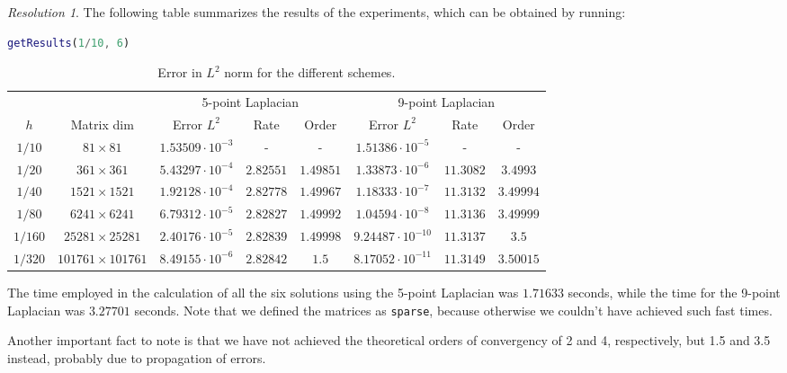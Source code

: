 \documentclass[10pt,a4paper]{article}
\theoremstyle{definition}
\theoremstyle{remark}
\newtheorem*{res}{Resolution}
\begin{document}
\begin{res}
  The following table summarizes the results of the experiments, which can be obtained by running:
  \begin{lstlisting}[language=Matlab]
getResults(1/10, 6)
\end{lstlisting}
  \begin{table}[ht]
    \centering
    \begin{tabular}{|c|c||c|c|c||c|c|c|}
      \hline
              &                       & \multicolumn{3}{c||}{5-point Laplacian} & \multicolumn{3}{c|}{9-point Laplacian}                                                               \\
      \cline{3-8}
      $h$     & Matrix dim            & Error $L^2$                             & Rate                                   & Order     & Error $L^2$             & Rate      & Order     \\
      \hline\hline
      $1/10$  & $81\times 81$         & $1.53509\cdot 10^{-3}$                  & -                                      & -         & $1.51386\cdot 10^{-5}$  & -         & -         \\
      $1/20$  & $361\times 361$       & $5.43297\cdot 10^{-4}$                  & $2.82551$                              & $1.49851$ & $1.33873\cdot 10^{-6}$  & $11.3082$ & $3.4993$  \\
      $1/40$  & $1521\times 1521$     & $1.92128\cdot 10^{-4}$                  & $2.82778$                              & $1.49967$ & $1.18333\cdot 10^{-7}$  & $11.3132$ & $3.49994$ \\
      $1/80$  & $6241\times 6241$     & $6.79312\cdot 10^{-5}$                  & $2.82827$                              & $1.49992$ & $1.04594\cdot 10^{-8}$  & $11.3136$ & $3.49999$ \\
      $1/160$ & $25281\times 25281$   & $2.40176\cdot 10^{-5}$                  & $2.82839$                              & $1.49998$ & $9.24487\cdot 10^{-10}$ & $11.3137$ & $3.5$     \\
      $1/320$ & $101761\times 101761$ & $8.49155\cdot 10^{-6}$                  & $2.82842$                              & $1.5$     & $8.17052\cdot 10^{-11}$ & $11.3149$ & $3.50015$ \\
      \hline
    \end{tabular}
    \caption{Error in $L^2$ norm for the different schemes.}
  \end{table}
  The time employed in the calculation of all the six solutions using the 5-point Laplacian was $1.71633$ seconds, while the time for the 9-point Laplacian was $3.27701$ seconds. Note that we defined the matrices as \texttt{sparse}, because otherwise we couldn't have achieved such fast times.

  Another important fact to note is that we have not achieved the theoretical orders of convergency of 2 and 4, respectively, but 1.5 and 3.5 instead, probably due to propagation of errors.
\end{res}
\end{document}
